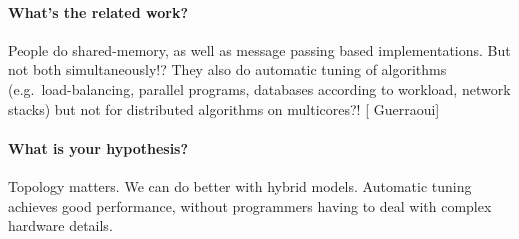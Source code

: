 \documentclass{article}
\newcommand{\stefan}[1]{
  {\color{skRed}[{\color{red}{SK}} #1]}}
\begin{document}
\paragraph{What's the related work?}
People do shared-memory, as well as message passing based
implementations. But not both simultaneously!? They also do automatic
tuning of algorithms (e.g.\ load-balancing,
parallel programs, databases according to workload, network stacks)
but not for distributed algorithms on multicores?! \stefan{Guerraoui}

\paragraph{What is your hypothesis?}
Topology matters. We can do better with hybrid models. Automatic tuning achieves good
performance, without programmers having to deal with complex hardware details.
\end{document}
